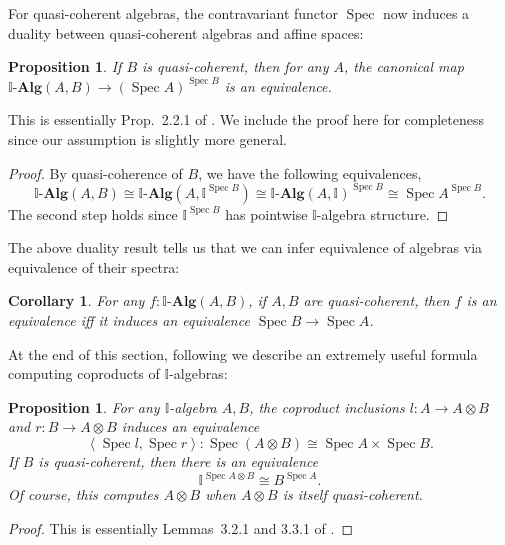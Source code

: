 \documentclass[12pt]{amsart}
\newtheorem{corollary}[theorem]{Corollary}
\newtheorem{proposition}[theorem]{Proposition}
\theoremstyle{definition}
\newcommand{\mb}[1]{\mathbf{#1}}
\newcommand{\mbb}[1]{\mathbb{#1}}
\newcommand{\I}{\mbb I}
\newcommand{\alg}{\text{-}\mb{Alg}}
\newcommand{\pair}[1]{\left\langle#1\right\rangle}
\newcommand{\spec}{\operatorname{Spec}}
\begin{document}
For quasi-coherent algebras, the contravariant functor $\spec$ now induces a duality between quasi-coherent algebras and affine spaces:

\begin{proposition}\label{prop:duality}
  If $B$ is quasi-coherent, then for any $A$, the canonical map $\I\alg(A,B)\to (\spec A)^{\spec B}$ is an equivalence.
\end{proposition}
This is essentially Prop.~2.2.1 of \citet{Cherubini_Coquand_Hutzler_2024}. We include the proof here for completeness since our assumption is slightly more general.
\begin{proof}
 By quasi-coherence of $B$, we have the following equivalences,
  \[ \I\alg(A,B) \cong \I\alg(A,\I^{\spec B}) \cong \I\alg(A,\I)^{\spec B} \cong \spec A^{\spec B}. \]
  The second step holds since $\I^{\spec B}$ has pointwise $\I$-algebra structure.
\end{proof}

The above duality result tells us that we can infer equivalence of algebras via equivalence of their spectra:

\begin{corollary}\label{cor:dualityeqv}
  For any $f \colon \I\alg(A,B)$, if $A,B$ are quasi-coherent, then $f$ is an equivalence iff it induces an equivalence $\spec B \to \spec A$. 
\end{corollary}

At the end of this section, following \citet{Cherubini_Coquand_Hutzler_2024} we describe an extremely useful formula computing coproducts of $\I$-algebras:

\begin{proposition}\label{prop:tensorasspace}
  For any $\I$-algebra $A,B$, the coproduct inclusions $l \colon A \to A \otimes B$ and $r \colon B \to A \otimes B$ induces an equivalence
  \[ \pair{\spec l,\spec r} \colon \spec(A \otimes B) \cong \spec A \times \spec B. \]
  If $B$ is quasi-coherent, then there is an equivalence
  \[ \I^{\spec A \otimes B} \cong B^{\spec A}. \]
  Of course, this computes $A \otimes B$ when $A \otimes B$ is itself quasi-coherent.
\end{proposition}
\begin{proof}
  This is essentially Lemmas~3.2.1 and 3.3.1 of \citet{Cherubini_Coquand_Hutzler_2024}.
\end{proof}
\end{document}
